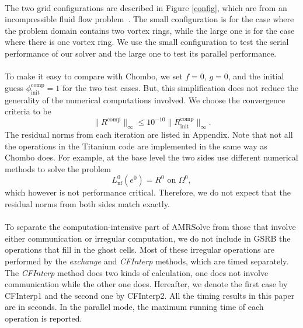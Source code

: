 \documentclass{ieee}
\numberwithin{equation}{section}
\begin{document}
\paragraph{}The two grid configurations are described in Figure \ref{config}, which are from an incompressible fluid flow problem~\cite{Martin:draft}. The small configuration is for the case where the problem domain contains two vortex rings, while the large one is for the case where there is one vortex ring. We use the small configuration to test the serial performance of our solver and the large one to test its parallel performance.  

\paragraph{}To make it easy to compare with Chombo, we set $f=0$, $g=0$, and the initial guess $\phi^{\text{comp}}_{\text{init}}=1$ for the two test cases. But, this simplification does not reduce the generality of the numerical computations involved.  We choose the convergence criteria to be
$$\|R^{\text{comp}}\|_{\infty} \leq 10^{-10}\|R^{\text{comp}}_{\text{init}}\|_{\infty}.$$ 
The residual norms from each iteration are listed in Appendix. Note that not all the operations in the Titanium code are implemented in the same way as Chombo does. For example, at the base level the two sides use different numerical methods to solve the problem
$$L^{0}_{\text{nf}} (e^0) = R^0 \text{ on }\Omega^0,$$  
which however is not performance critical. Therefore, we do not expect that the residual norms from both sides match exactly.


\paragraph{}To separate the computation-intensive part of AMRSolve from those that involve either communication or irregular computation, we do not include in GSRB the operations that fill in the ghost cells. Most of these irregular operations are performed by the {\it exchange} and {\it CFInterp} methods, which are timed separately. The {\it CFInterp} method does two kinds of calculation, one does not involve communication while the other one does. Hereafter, we denote the first case by CFInterp1 and the second one by CFInterp2. All the timing results in this paper are in seconds. In the parallel mode, the maximum running time of each operation is reported.
\end{document}
